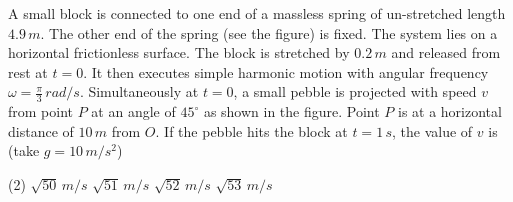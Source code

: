 
\item A small block is connected to one end of a massless spring of un-stretched length $4.9\,m$. The other end of the spring (see the figure) is fixed. The system lies on a horizontal frictionless surface. The block is stretched by $0.2\,m$ and released from rest at $t = 0$. It then executes simple harmonic motion with angular frequency $\omega = \frac{\pi}{3}\,rad/s$. Simultaneously at $t = 0$, a small pebble is projected with speed $v$ from point $P$ at an angle of $45^\circ$ as shown in the figure. Point $P$ is at a horizontal distance of $10\,m$ from $O$. If the pebble hits the block at $t = 1\,s$, the value of $v$ is (take $g = 10\,m/s^2$)
    \begin{center}
    \end{center}
    \begin{tasks}(2)
        \task $\sqrt{50}\,m/s$
        \task $\sqrt{51}\,m/s$
        \task $\sqrt{52}\,m/s$
        \task $\sqrt{53}\,m/s$
    \end{tasks}
